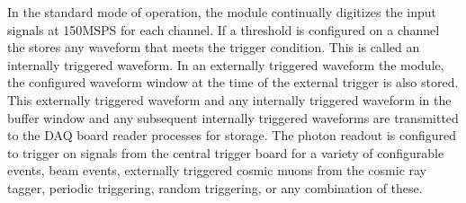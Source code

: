 
In the standard mode of operation, the module continually digitizes the input signals at \num{150}{MSPS} for each channel.  If a threshold is configured on a channel the  stores any waveform that meets the trigger condition.  This is called an internally triggered waveform. In an externally triggered waveform the module, the configured waveform window at the time of the external trigger is also stored.  This externally triggered waveform and any internally triggered waveform in the buffer window and any subsequent internally triggered waveforms are transmitted to the DAQ board reader processes for storage. The photon readout is configured to trigger on signals from the central trigger board for a variety of configurable events, beam events, externally triggered cosmic muons from the cosmic ray tagger, periodic triggering, random triggering, or any combination of these.


